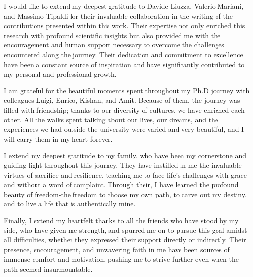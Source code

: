 I would like to extend my deepest gratitude to Davide Liuzza, Valerio Mariani, and Massimo Tipaldi for their invaluable collaboration in the writing of the contributions presented within this work. Their expertise not only enriched this research with profound scientific insights but also provided me with the encouragement and human support necessary to overcome the challenges encountered along the journey. Their dedication and commitment to excellence have been a constant source of inspiration and have significantly contributed to my personal and professional growth.

I am grateful for the beautiful moments spent throughout my Ph.D journey with colleagues Luigi, Enrico, Kishan, and Amit. Because of them, the journey was filled with friendship; thanks to our diversity of cultures, we have enriched each other. All the walks spent talking about our lives, our dreams, and the experiences we had outside the university were varied and very beautiful, and I will carry them in my heart forever.

I extend my deepest gratitude to my family, who have been my cornerstone and guiding light throughout this journey. They have instilled in me the invaluable virtues of sacrifice and resilience, teaching me to face life's challenges with grace and without a word of complaint. Through their, I have learned the profound beauty of freedom-the freedom to choose my own path, to carve out my destiny, and to live a life that is authentically mine. 

Finally, I extend my heartfelt thanks to all the friends who have stood by my side, who have given me strength, and spurred me on to pursue this goal amidst all difficulties, whether they expressed their support directly or indirectly. Their presence, encouragement, and unwavering faith in me have been sources of immense comfort and motivation, pushing me to strive further even when the path seemed insurmountable. 





